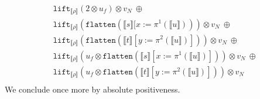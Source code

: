 \documentclass[a4paper,UKenglish,cleveref,autoref,numberwithinsect]{lipics-v2019}
\theoremstyle{definition}
\newcommand{\flatten}{\mathtt{flatten}}
\newcommand{\lift}{\mathtt{lift}}
\newcommand{\typeinterpret}[1]{\llbracket #1 \rrbracket}
\newcommand{\interpret}[1]{\llbracket #1 \rrbracket}
\begin{document}
\begin{itemize}
\[\begin{array}{l}
  \phantom{A}
  \lift_{\typeinterpret{\rho}}(2 \otimes u_f) \otimes v_N\ \oplus \\
  \phantom{A}
  \lift_{\typeinterpret{\rho}}(\flatten(\interpret{s}[x:=
    \pi^1(\interpret{u}))) \otimes v_N\ \oplus \\
  \phantom{A}
  \lift_{\typeinterpret{\rho}}(\flatten(\interpret{t}[y:=
    \pi^2(\interpret{u})])) \otimes v_N\ \oplus \\
  \phantom{A}
  \lift_{\typeinterpret{\rho}}(u_f \otimes
    \flatten(\interpret{s}[x:=\pi^1(\interpret{u})])) \otimes v_N\ 
    \oplus \\
  \phantom{A}
  \lift_{\typeinterpret{\rho}}(u_f \otimes\flatten(\interpret{t}[y:=
    \pi^2(\interpret{u})])) \otimes v_N \\
  \end{array}
  \]
  We conclude once more by absolute positiveness.
\end{itemize}
\end{document}
